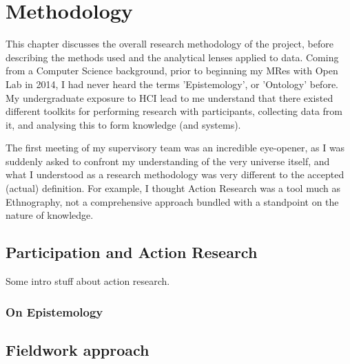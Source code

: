 \chapter{Methodology}
\label{sec:method}

This chapter discusses the overall research methodology of the project, before describing the methods used and the analytical lenses applied to data. Coming from a Computer Science background, prior to beginning my MRes with Open Lab in 2014, I had never heard the terms 'Epistemology', or 'Ontology' before. My undergraduate exposure to HCI lead to me understand that there existed different toolkits for performing research with participants, collecting data from it, and analysing this to form knowledge (and systems).

The first meeting of my supervisory team was an incredible eye-opener, as I was suddenly asked to confront my understanding of the very universe itself, and what I understood as a research methodology was very different to the accepted (actual) definition. For example, I thought Action Research was a tool much as Ethnography, not a comprehensive approach bundled with a standpoint on the nature of knowledge. 


\section{Participation and Action Research}
\label{sec:method:approach}

Some intro stuff about action research.



\subsection{On Epistemology}

\section{Fieldwork approach}
\label{sec:method:fieldwork}

